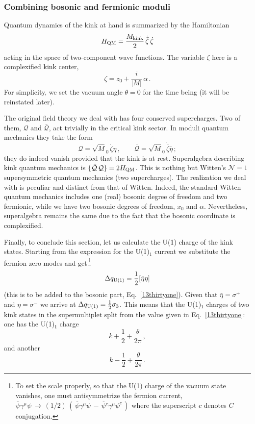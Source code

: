 \documentclass[epsfig,12pt]{article}
\def\beq{\begin{equation}}
\def\eeq{\end{equation}}
\def\beq{\begin{equation}}
\def\eeq{\end{equation}}
\newcommand{\ov}{\overline}
\newcommand{\bpsi}{\ov{\psi}{}}
\begin{document}
\subsubsection{Combining bosonic and fermionic moduli}
\label{cbfm}

	Quantum dynamics of the kink at hand is summarized by the
	Hamiltonian
\beq
H_{\rm QM} =  \frac{M_{\rm kink}}{2}\,\dot{\bar\zeta}\, \dot\zeta
\label{13fourtynine}
\eeq
	acting in the space of two-component wave functions.
	The variable $\zeta$ here is a complexified kink center,
\beq
\zeta = z_0 + \frac{i}{|M|}\, \alpha\,.
\label{13fifty}
\eeq
	For simplicity, we set the vacuum angle $\theta =0$ for the time being
	(it will be reinstated later). 

	The original field theory we deal with has four conserved supercharges.
	Two of them, ${\mathcal Q}$ and $\bar {\mathcal Q}$, 
	act trivially in the critical kink sector. In moduli quantum
	mechanics they take the form
\beq
{\mathcal Q}= {\sqrt M_0}\,  \dot\zeta\eta\,,\qquad 
\bar {\mathcal Q}=  {\sqrt M_0}\, \dot{\bar\zeta}\bar \eta \, ;
\label{13fiftyone}
\eeq
	they do indeed vanish provided that the kink is at rest.
	Superalgebra describing kink quantum mechanics is
	$\{\bar {\mathcal Q}\, {\mathcal Q}\} = 2 H_{\rm QM}$. This is nothing but 
	Witten's ${\mathcal N}=1$
	supersymmetric quantum mechanics  (two supercharges).
	The realization we deal with is peculiar and distinct from 
	that of Witten. Indeed, the standard Witten quantum mechanics
	includes one (real) bosonic degree of freedom and two fermionic, while
	we have two bosonic degrees of freedom,
	$x_0$ and $\alpha$. Nevertheless, superalgebra remains the same
	due to the fact that the bosonic coordinate is complexified.
	 
	Finally, to conclude this section, let us calculate the U(1) charge
	of the kink states. Starting from the expression  for the U(1)$_1$ current we
	substitute the fermion zero modes and get\,\footnote{To set the scale properly, so that
	the U(1) charge of the vacuum state vanishes, one must
	antisymmetrize
	the fermion current, 
	$\bpsi\gamma^\mu\psi \,\to\, (1/2)\,\left(\, \bpsi\gamma^\mu\psi \,-\, \bpsi{}^c\gamma^\mu\psi^c \,\right)
	$ where the superscript $c$ denotes $C$ conjugation.}
\beq
\Delta q_{\rm U(1)} = \frac{1}{2} [\bar\eta\eta ]
\label{13fiftytwo}
\eeq
	(this is to be added to the bosonic part, Eq.~\eqref{13thirtyone}).
	Given that $\bar \eta = \sigma^+$ and $ \eta = \sigma^-$ we arrive at
	$\Delta q_{\rm U(1)} = \frac{1}{2} \sigma_3$. This means that the U(1)$_1$ charges
	of two kink states in the supermultiplet
	split from the value given in Eq.~\eqref{13thirtyone}:
	one has the U(1)$_1$ charge
$$
k+\frac{1}{2} +\frac{\theta}{2\pi}\,,
$$
and another
$$
k-\frac{1}{2} +\frac{\theta}{2\pi}\,.
$$
\end{document}
